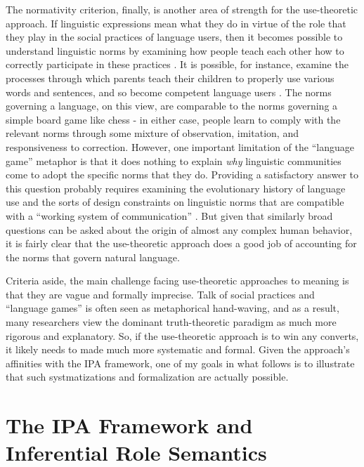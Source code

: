 The normativity criterion, finally, is another area of strength for the use-theoretic approach. If linguistic expressions mean what they do in virtue of the role that they play in the social practices of language users, then it becomes possible to understand linguistic norms by examining how people teach each other how to correctly participate in these practices \citep{Brandom:1994,Wittgenstein:1953,Kripke:1982}. It is possible, for instance, examine the processes through which parents teach their children to properly use various words and sentences, and so become competent language users \citep{Brandom:2010,Sellars:1954}. The norms governing a language, on this view, are comparable to the norms governing a simple board game like chess - in either case, people learn to comply with the relevant norms through some mixture of observation, imitation, and responsiveness to correction. However, one important limitation of the ``language game'' metaphor is that it does nothing to explain \textit{why} linguistic communities come to adopt the specific norms that they do. Providing a satisfactory answer to this question probably requires examining the evolutionary history of language use and the sorts of design constraints on linguistic norms that are compatible with a ``working system of communication'' \citep[][p. 54]{Dennett:2010}. But given that similarly broad questions can be asked about the origin of almost any complex human behavior, it is fairly clear that the use-theoretic approach does a good job of accounting for the norms that govern natural language.

Criteria aside, the main challenge facing use-theoretic approaches to meaning is that they are vague and formally imprecise. Talk of social practices and ``language games'' is often seen as metaphorical hand-waving, and as a result, many researchers view the dominant truth-theoretic paradigm as much more rigorous and explanatory. So, if the use-theoretic approach is to win any converts, it likely needs to made much more systematic and formal. Given the approach's affinities with the IPA framework, one of my goals in what follows is to illustrate that such systmatizations and formalization are actually possible. 

\section{The IPA Framework and Inferential Role Semantics}

